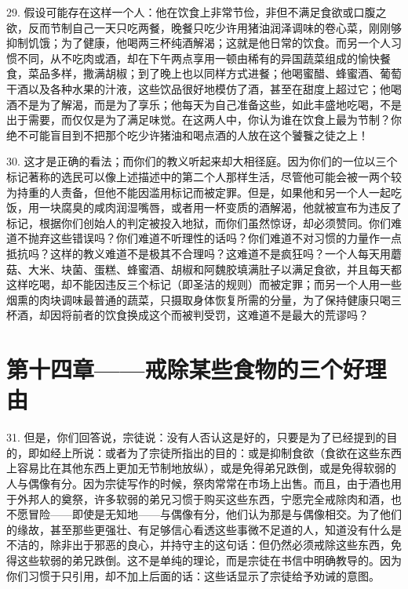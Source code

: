 29. 假设可能存在这样一个人：他在饮食上非常节俭，非但不满足食欲或口腹之欲，反而节制自己一天只吃两餐，晚餐只吃少许用猪油润泽调味的卷心菜，刚刚够抑制饥饿；为了健康，他喝两三杯纯酒解渴；这就是他日常的饮食。而另一个人习惯不同，从不吃肉或酒，却在下午两点享用一顿由稀有的异国蔬菜组成的愉快餐食，菜品多样，撒满胡椒；到了晚上也以同样方式进餐；他喝蜜醋、蜂蜜酒、葡萄干酒以及各种水果的汁液，这些饮品很好地模仿了酒，甚至在甜度上超过它；他喝酒不是为了解渴，而是为了享乐；他每天为自己准备这些，如此丰盛地吃喝，不是出于需要，而仅仅是为了满足味觉。在这两人中，你认为谁在饮食上最为节制？你绝不可能盲目到不把那个吃少许猪油和喝点酒的人放在这个饕餮之徒之上！\par

30. 这才是正确的看法；而你们的教义听起来却大相径庭。因为你们的一位以三个标记著称的选民可以像上述描述中的第二个人那样生活，尽管他可能会被一两个较为持重的人责备，但他不能因滥用标记而被定罪。但是，如果他和另一个人一起吃饭，用一块腐臭的咸肉润湿嘴唇，或者用一杯变质的酒解渴，他就被宣布为违反了标记，根据你们创始人的判定被投入地狱，而你们虽然惊讶，却必须赞同。你们难道不抛弃这些错误吗？你们难道不听理性的话吗？你们难道不对习惯的力量作一点抵抗吗？这样的教义难道不是极其不合理吗？这难道不是疯狂吗？一个人每天用蘑菇、大米、块菌、蛋糕、蜂蜜酒、胡椒和阿魏胶填满肚子以满足食欲，并且每天都这样吃喝，却不能因违反三个标记（即圣洁的规则）而被定罪；而另一个人用一些烟熏的肉块调味最普通的蔬菜，只摄取身体恢复所需的分量，为了保持健康只喝三杯酒，却因将前者的饮食换成这个而被判受罚，这难道不是最大的荒谬吗？\par


\section{第十四章——戒除某些食物的三个好理由}

31. 但是，你们回答说，宗徒说：没有人否认这是好的，只要是为了已经提到的目的，即如经上所说：或者为了宗徒所指出的目的：或是抑制食欲（食欲在这些东西上容易比在其他东西上更加无节制地放纵），或是免得弟兄跌倒，或是免得软弱的人与偶像有分。因为宗徒写作的时候，祭肉常常在市场上出售。而且，由于酒也用于外邦人的奠祭，许多软弱的弟兄习惯于购买这些东西，宁愿完全戒除肉和酒，也不愿冒险——即使是无知地——与偶像有分，他们认为那是与偶像相交。为了他们的缘故，甚至那些更强壮、有足够信心看透这些事微不足道的人，知道没有什么是不洁的，除非出于邪恶的良心，并持守主的这句话：但仍然必须戒除这些东西，免得这些软弱的弟兄跌倒。这不是单纯的理论，而是宗徒在书信中明确教导的。因为你们习惯于只引用，却不加上后面的话：这些话显示了宗徒给予劝诫的意图。\par


